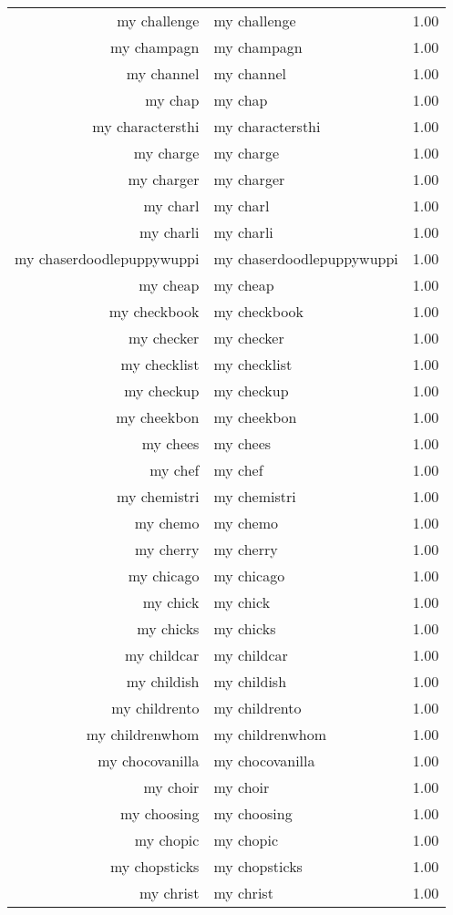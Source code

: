 \begin{table}[ht]
\begin{tabular}{rlr}
  my challenge & my challenge & 1.00 \\ 
  my champagn & my champagn & 1.00 \\ 
  my channel & my channel & 1.00 \\ 
  my chap & my chap & 1.00 \\ 
  my charactersthi & my charactersthi & 1.00 \\ 
  my charge & my charge & 1.00 \\ 
  my charger & my charger & 1.00 \\ 
  my charl & my charl & 1.00 \\ 
  my charli & my charli & 1.00 \\ 
  my chaserdoodlepuppywuppi & my chaserdoodlepuppywuppi & 1.00 \\ 
  my cheap & my cheap & 1.00 \\ 
  my checkbook & my checkbook & 1.00 \\ 
  my checker & my checker & 1.00 \\ 
  my checklist & my checklist & 1.00 \\ 
  my checkup & my checkup & 1.00 \\ 
  my cheekbon & my cheekbon & 1.00 \\ 
  my chees & my chees & 1.00 \\ 
  my chef & my chef & 1.00 \\ 
  my chemistri & my chemistri & 1.00 \\ 
  my chemo & my chemo & 1.00 \\ 
  my cherry & my cherry & 1.00 \\ 
  my chicago & my chicago & 1.00 \\ 
  my chick & my chick & 1.00 \\ 
  my chicks & my chicks & 1.00 \\ 
  my childcar & my childcar & 1.00 \\ 
  my childish & my childish & 1.00 \\ 
  my childrento & my childrento & 1.00 \\ 
  my childrenwhom & my childrenwhom & 1.00 \\ 
  my chocovanilla & my chocovanilla & 1.00 \\ 
  my choir & my choir & 1.00 \\ 
  my choosing & my choosing & 1.00 \\ 
  my chopic & my chopic & 1.00 \\ 
  my chopsticks & my chopsticks & 1.00 \\ 
  my christ & my christ & 1.00 \\ 

\end{tabular}
\end{table}
